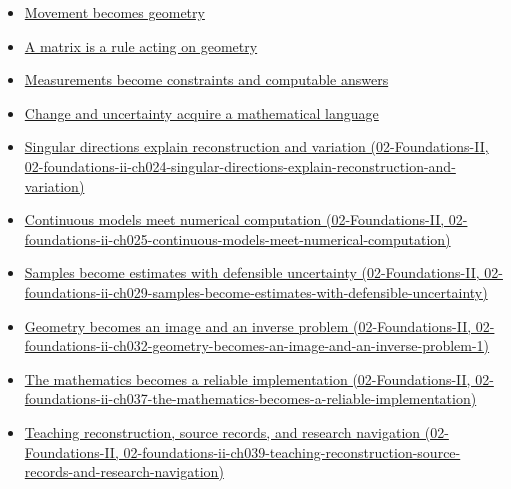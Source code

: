 \begin{itemize}
\tightlist
\item
  \hyperref[01-foundations-i-ch017-movement-becomes-geometry]{Movement becomes geometry}
\item
  \hyperref[01-foundations-i-ch018-a-matrix-is-a-rule-acting-on-geometry]{A matrix is a rule acting on geometry}
\item
  \hyperref[01-foundations-i-ch019-measurements-become-constraints-and-computable-answers]{Measurements become constraints and computable answers}
\item
  \hyperref[01-foundations-i-ch020-change-and-uncertainty-acquire-a-mathematical-language]{Change and uncertainty acquire a mathematical language}
\item
  \href{../02-Foundations-II/main.pdf\#nameddest=02-foundations-ii-ch024-singular-directions-explain-reconstruction-and-variation}{Singular directions explain reconstruction and variation (02-Foundations-II, 02-foundations-ii-ch024-singular-directions-explain-reconstruction-and-variation)}
\item
  \href{../02-Foundations-II/main.pdf\#nameddest=02-foundations-ii-ch025-continuous-models-meet-numerical-computation}{Continuous models meet numerical computation (02-Foundations-II, 02-foundations-ii-ch025-continuous-models-meet-numerical-computation)}
\item
  \href{../02-Foundations-II/main.pdf\#nameddest=02-foundations-ii-ch029-samples-become-estimates-with-defensible-uncertainty}{Samples become estimates with defensible uncertainty (02-Foundations-II, 02-foundations-ii-ch029-samples-become-estimates-with-defensible-uncertainty)}
\item
  \href{../02-Foundations-II/main.pdf\#nameddest=02-foundations-ii-ch032-geometry-becomes-an-image-and-an-inverse-problem-1}{Geometry becomes an image and an inverse problem (02-Foundations-II, 02-foundations-ii-ch032-geometry-becomes-an-image-and-an-inverse-problem-1)}
\item
  \href{../02-Foundations-II/main.pdf\#nameddest=02-foundations-ii-ch037-the-mathematics-becomes-a-reliable-implementation}{The mathematics becomes a reliable implementation (02-Foundations-II, 02-foundations-ii-ch037-the-mathematics-becomes-a-reliable-implementation)}
\item
  \href{../02-Foundations-II/main.pdf\#nameddest=02-foundations-ii-ch039-teaching-reconstruction-source-records-and-research-navigation}{Teaching reconstruction, source records, and research navigation (02-Foundations-II, 02-foundations-ii-ch039-teaching-reconstruction-source-records-and-research-navigation)}
\end{itemize}

